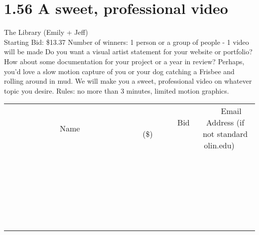 \documentclass[11pt]{article}
\begin{document}
\section*{1.56 A sweet, professional video}
The Library (Emily + Jeff)
\\
Starting Bid: \$13.37
\newline
Number of winners: 1 person or a group of people - 1 video will be made
\newline
Do you want a visual artist statement for your website or portfolio? How about some documentation for your project or a year in review? Perhaps, you'd love a slow motion capture of you or your dog catching a Frisbee and rolling around in mud. We will make you a sweet, professional video on whatever topic you desire. Rules: no more than 3 minutes, limited motion graphics.
\\[6ex]
\begin{tabular}{c c c}
~~~~~~~~~~~~~Name~~~~~~~~~~~~~ & ~~~~~~~~~Bid (\$)~~~~~~~~~  & ~~~Email Address (if not standard olin.edu)~~~\\
 & & \\
\hline
 & & \\
\hline
 & & \\
\hline
 & & \\
\hline
 & & \\
\hline
 & & \\
\hline
 & & \\
\hline
 & & \\
\hline
 & & \\
\hline
 & & \\
\hline
 & & \\
\hline
 & & \\
\hline
 & & \\
\hline
 & & \\
\hline
 & & \\
\hline
 & & \\
\hline
 & & \\
\hline
 & & \\
\hline
 & & \\
\hline
 & & \\
\hline
 & & \\
\hline
 & & \\
\hline
 & & \\
\hline
 & & \\
\hline
 & & \\
\hline
 & & \\
\hline
\end{tabular}
\newpage
\end{document}
